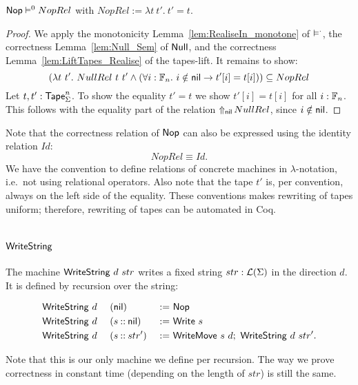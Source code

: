 \begin{lemma}
  \label{lem:Nop_Sem}
  $\mathsf{Nop} \mathrel{\vDash^{0}} NopRel$ with $NopRel := \lambda t~t'.~t'=t$.
\end{lemma}
\begin{proof}
  We apply the monotonicity Lemma~\ref{lem:RealiseIn_monotone} of $\mathrel{\vDash^{\cdot}}$, the correctness Lemma~\ref{lem:Null_Sem} of $\mathsf{Null}$, and the
  correctness Lemma~\ref{lem:LiftTapes_Realise} of the tapes-lift.  It remains to show:
  \[
    \left( \lambda t~t'.~ NullRel~t~t' \land \left(\forall i:\mathbb{F}_n.~i \notin \mathsf{nil} \rightarrow t'[i] = t[i] \right)\right)
    \subseteq NopRel
  \]
  Let $t,t' : \mathsf{Tape}_\Sigma^n$.  To show the equality $t'=t$ we show $t'[i]=t[i]$ for all $i:\mathbb{F}_n$.  This follows with the equality part of the
  relation $\mathop{\Uparrow_{\mathsf{nil}}} NullRel$, since $i \notin \mathsf{nil}$.
\end{proof}

Note that the correctness relation of $\mathsf{Nop}$ can also be expressed using the identity relation $Id$:
\[
  NopRel \equiv Id.
\]
We have the convention to define relations of concrete machines in $\lambda$-notation, i.e.\ not using relational operators.  Also note that the tape
$t'$ is, per convention, always on the left side of the equality.  These conventions makes rewriting of tapes uniform; therefore, rewriting of tapes
can be automated in Coq.

\section{$\MS{WriteString}$}
\label{sec:WriteString}
%

The machine $\mathsf{WriteString}~d~str$ writes a fixed string $str:\mathcal{L}(\Sigma)$ in the direction $d$.  It is defined by recursion over the string:
\begin{definition}[$\MS{WriteString}$][WriteString]
  \begin{alignat*}{3}
    &\mathsf{WriteString}~d~&&(\mathsf{nil})         &~:=~& \mathsf{Nop} \\
    &\mathsf{WriteString}~d~&&(s \mathbin{::} \mathsf{nil}) &~:=~& \mathsf{Write}~s \\
    &\mathsf{WriteString}~d~&&(s \mathbin{::} str') &~:=~& \mathsf{WriteMove}~s~d ;~ \mathsf{WriteString}~d~str'.
  \end{alignat*}
\end{definition}

Note that this is our only machine we define per recursion.  The way we prove correctness in constant time (depending on the length of $str$) is still
the same.

